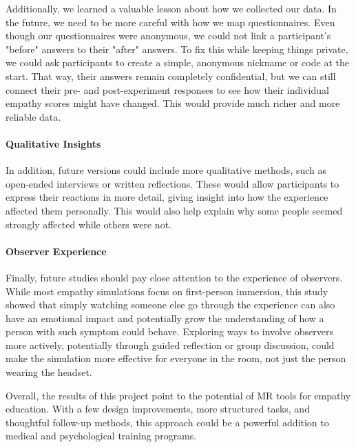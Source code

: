 \vspace{1em}

Additionally, we learned a valuable lesson about how we collected our data. In the future, we need to be more careful with how we map questionnaires. Even though our questionnaires were anonymous, we could not link a participant's "before" answers to their "after" answers. To fix this while keeping things private, we could ask participants to create a simple, anonymous nickname or code at the start. That way, their answers remain completely confidential, but we can still connect their pre- and post-experiment responses to see how their individual empathy scores might have changed. This would provide much richer and more reliable data.

\paragraph{Qualitative Insights} In addition, future versions could include more qualitative methods, such as open-ended interviews or written reflections. These would allow participants to express their reactions in more detail, giving insight into how the experience affected them personally. This would also help explain why some people seemed strongly affected while others were not.

\paragraph{Observer Experience} Finally, future studies should pay close attention to the experience of observers. While most empathy simulations focus on first-person immersion, this study showed that simply watching someone else go through the experience can also have an emotional impact and potentially grow the understanding of how a person with such symptom could behave. Exploring ways to involve observers more actively, potentially through guided reflection or group discussion, could make the simulation more effective for everyone in the room, not just the person wearing the headset.

\vspace{1em}

Overall, the results of this project point to the potential of MR tools for empathy education. With a few design improvements, more structured tasks, and thoughtful follow-up methods, this approach could be a powerful addition to medical and psychological training programs.